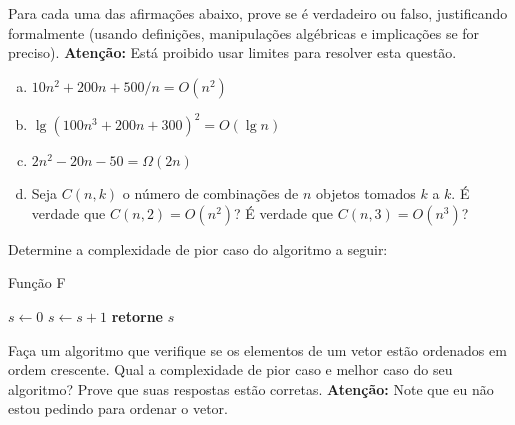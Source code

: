 \documentclass[a4paper,12pt]{exam}
\begin{document}



\bigskip 

\bigskip 

\begin{center}
\end{center}


\begin{questions}

\question[2.5] Para cada uma das afirmações abaixo, prove se é verdadeiro ou falso,  justificando formalmente (usando definições, manipulações algébricas e implicações se for preciso). \textbf{Atenção:} Está proibido usar limites para resolver esta questão.
\begin{enumerate}[(a)]
\item $10n^2 + 200n + 500/n = O(n^2)$
\item $\lg(100n^3 + 200n+300)^2 = O(\lg n)$
\item $2n^2 - 20n - 50 = \Omega(2n)$ 
\item Seja $C(n,k)$ o número de combinações de $n$ objetos tomados $k$ a $k$. É verdade que $C(n,2) = O(n^2)$? É verdade que $C(n,3) = O(n^3)$?
\end{enumerate}

\question[2.5]
Determine a complexidade de pior caso do algoritmo a seguir:


\begin{algorithm}
\caption{Função F}
\label{FuncF}
\algrenewcommand{}
\algrenewcommand{}
\algrenewcommand{}
\algrenewcommand{}
\algrenewcommand{}
\begin{algorithmic}[1]
    \State $s \gets 0$ 
            \State $s \gets s+1$
            \EndIf
        \EndFor
	\EndFor
	\State \textbf{retorne} $s$
\EndProcedure
\end{algorithmic}
\end{algorithm}


\question[2.5] Faça um algoritmo que verifique se os elementos de um vetor estão ordenados em ordem crescente. Qual a complexidade de pior caso e melhor caso do seu algoritmo? Prove que suas respostas estão corretas. \textbf{Atenção:} Note que eu não estou pedindo para ordenar o vetor.




\end{questions}
\end{document}
